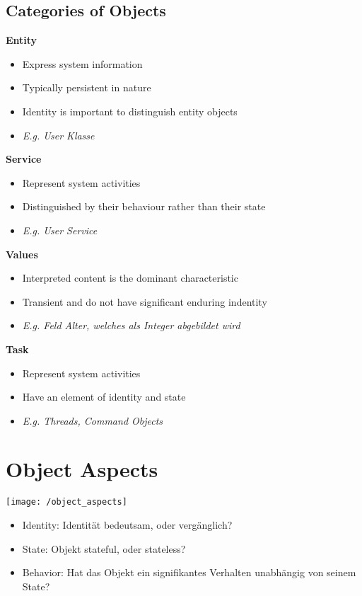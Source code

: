 \subsection{Categories of Objects}
\textbf{Entity}
\begin{itemize}[topsep=0pt]
    \itemsep -0.4em
    \item Express system information
    \item Typically persistent in nature
    \item Identity is important to distinguish entity objects
    \item \textit{E.g. User Klasse}
\end{itemize}
\textbf{Service}
\begin{itemize}[topsep=0pt]
    \itemsep -0.4em
    \item Represent system activities
    \item Distinguished by their behaviour rather than their state
    \item \textit{E.g. User Service}
\end{itemize}
\textbf{Values}
\begin{itemize}[topsep=0pt]
    \itemsep -0.4em
    \item Interpreted content is the dominant characteristic
    \item Transient and do not have significant enduring indentity
    \item \textit{E.g. Feld Alter, welches als Integer abgebildet wird}
\end{itemize}
\textbf{Task}
\begin{itemize}[topsep=0pt]
    \itemsep -0.4em
    \item Represent system activities
    \item Have an element of identity and state
    \item \textit{E.g. Threads, Command Objects}
\end{itemize}

\section{Object Aspects}
\texttt{[image: /object\_aspects]}
\begin{itemize}[topsep=0pt]
    \itemsep -0.4em
    \item Identity: Identität bedeutsam, oder vergänglich?
    \item State: Objekt stateful, oder stateless?
    \item Behavior: Hat das Objekt ein signifikantes Verhalten unabhängig von seinem State?
\end{itemize}

